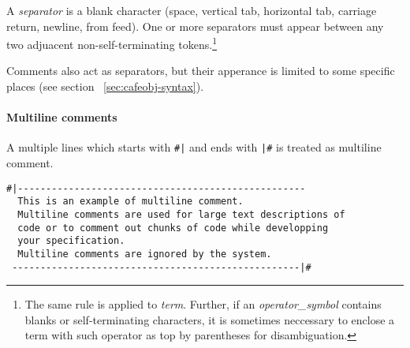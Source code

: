 \documentclass[a4paper]{article}
\def\nonterm#1{\textit{#1}\null}
\begin{document}
A \nonterm{separator} is a blank character (space, vertical tab,
horizontal tab, carriage return, newline, from feed).
One or more separators must appear between any two adjuacent
non-self-terminating tokens.\footnote{The same rule is applied to 
  \nonterm{term}.
  Further, if an \nonterm{operator\_symbol} contains blanks or
  self-terminating characters, it is sometimes neccessary to enclose a
  term with such operator as top by parentheses for disambiguation.}

Comments also act as separators, but their apperance is limited to
some specific places (see section ~\ref{sec:cafeobj-syntax}).

\paragraph{Multiline comments}
A multiple lines which starts with \verb+#|+ and ends with \verb+|#+
is treated as multiline comment.
\begin{center}
\begin{verbatim}
#|---------------------------------------------------
  This is an example of multiline comment.
  Multiline comments are used for large text descriptions of
  code or to comment out chunks of code while developping
  your specification. 
  Multiline comments are ignored by the system.
 ---------------------------------------------------|#
\end{verbatim}
\end{center}
\end{document}
